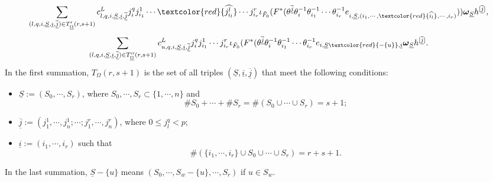 \documentclass[12pt, a4paper]{article}
\begin{document}
$$
\sum_{(l,q,i,\underline S,\underline i,\underline{\overline j})\in T'_{\underline\Omega}(r,s+1)} c^L_{l,q,i,\underline S,\underline i,\underline{\overline j}}j^q_ij^1_{i_1}\cdots\textcolor{red}{\widehat{j^l_{i_l}}}\cdots j^r_{i_r}\iota_{\tilde F_0}(F^*(\theta^{\underline{\overline j}}\theta_i^{-1}\theta_{i_1}^{-1}\cdots\theta_{i_r}^{-1}e_{i,\underline S,(i_1,\cdots,\textcolor{red}{\widehat{i_l}},\cdots,i_r)}))\boldsymbol{\omega}_{\underline S}h^{[\underline{\overline j}]},
$$
$$
\sum_{(l,q,i,\underline S,\underline i,\underline{\overline j})\in T''_{\underline\Omega}(r,s+1)} c^L_{u,q,i,\underline S,\underline i,\underline{\overline j}}j^q_ij^1_{i_1}\cdots j^r_{i_r}\iota_{\tilde F_0}(F^*(\theta^{\underline{\overline j}}\theta_i^{-1}\theta_{i_1}^{-1}\cdots\theta_{i_r}^{-1}e_{i,\underline S\textcolor{red}{-\{u\}},\underline i}\boldsymbol{\omega}_{\underline S}h^{[\underline{\overline j}]}.
$$
In the first summation, \(T_\Omega(r,s+1)\) is the set of all triples $(\underline S,\underline i,\underline{\overline j})$ that meet the following conditions:
\begin{itemize}
    \item $\underline S:=(S_0,\cdots,S_r)$, where $S_0,\cdots,S_r\subset\{1,\cdots,n\}$ and 
    $$\#S_0+\cdots+\#S_r=\#(S_0\cup\cdots\cup S_r)=s+1;$$
    \item $\underline{\overline j}:=(j^1_1,\cdots,j^1_n;\cdots;j^r_1,\cdots,j^r_n)$, where $0\leq j^q_l<p$;
    \item $\underline i:=(i_1,\cdots,i_r)$ such that
    $$
    \#(\{i_1,\cdots,i_r\}\cup S_0\cup\cdots\cup S_r)=r+s+1.
    $$
\end{itemize}
In the last summation, $\underline S-\{u\}$ means $(S_0,\cdots,S_w-\{u\},\cdots,S_r)$ if $u\in S_w$.
\end{document}
